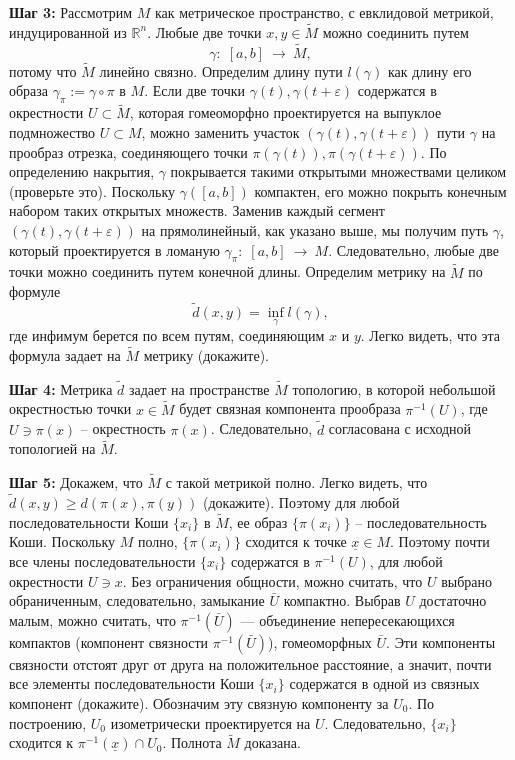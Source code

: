 \documentclass[12pt]{book}
\newcommand{\arrow}{{\:\longrightarrow\:}}
\renewcommand{\epsilon}{\varepsilon}
\def\R{{\mathbb R}}
\theoremstyle{upshape}
\theoremstyle{generic}
\theoremstyle{upshapenonumber}
\newcommand{\следствие}{%
     \refstepcounter{teorema}
     {\noindent\bf Следствие \thechapter.\arabic{teorema}:\ }}
\newcommand{\пример}{%
     \refstepcounter{teorema}
     {\noindent\bf Пример \thechapter.\arabic{teorema}:\ }}
\newcommand{\лемма}{%
     \refstepcounter{teorema}
     {\noindent\bf Лемма \thechapter.\arabic{teorema}:\ }}
\newcommand{\теорема}{%
     \refstepcounter{teorema}
     {\noindent\bf Теорема \thechapter.\arabic{teorema}:\ }}
\newcommand{\утверждение}{%
     \refstepcounter{teorema}
     {\noindent\bf Утверждение \thechapter.\arabic{teorema}:\ }}
\def\хфилл{\hfill}
\def\ноиндент{\noindent}
\def\бф{\bf}
\begin{document}
\ноиндент
{\бф Шаг 3:}
Рассмотрим $M$ как метрическое пространство,
с евклидовой метрикой, индуцированной из $\R^n$.
Любые две точки $x, y\in \tilde M$ можно соединить
путем \[ \gamma:\; [a,b] \arrow \tilde M,\] потому что $\tilde M$ линейно связно.
Определим длину пути $l(\gamma)$
как длину его образа $\gamma_\pi:= \gamma\circ \pi$ в $M$.
Если две точки $\gamma(t), \gamma(t+\epsilon)$
содержатся в окрестности $U\subset \tilde M$, которая
гомеоморфно проектируется на выпуклое подмножество
$U\subset M$, можно заменить участок $(\gamma(t), \gamma(t+\epsilon))$
пути $\gamma$ на прообраз отрезка, соединяющего точки
$\pi(\gamma(t)), \pi(\gamma(t+\epsilon))$.
По определению накрытия, $\gamma$ покрывается
такими открытыми множествами целиком
(проверьте это). Поскольку $\gamma([a,b])$
компактен, его можно покрыть конечным набором
таких открытых множеств. Заменив каждый
сегмент $(\gamma(t), \gamma(t+\epsilon))$
на прямолинейный, как указано выше, мы 
получим путь $\gamma$, который проектируется
в ломаную $\gamma_\pi:\; [a,b] \arrow M$.
Следовательно, любые две точки можно соединить
путем конечной длины. Определим метрику
на $\tilde M$ по формуле
\[
\tilde d(x,y) = \inf_\gamma l(\gamma),
\]
где инфимум берется по всем путям, соединяющим
$x$ и $y$. Легко видеть, что эта формула
задает на $\tilde M$ метрику (докажите).


\хфилл


\ноиндент
{\бф Шаг 4:} Метрика $\tilde d$ задает на пространстве
$\tilde M$ топологию, в которой небольшой окрестностью
точки $x\in \tilde M$ будет связная компонента
прообраза $\pi^{-1}(U)$, где $U\ni \pi(x)$ --
окрестность $\pi(x)$. Следовательно, $\tilde d$
согласована с исходной топологией на $\tilde M$.

\хфилл


\ноиндент
{\бф Шаг 5:}
Докажем, что $\tilde M$ с такой метрикой полно.
 Легко видеть, что 
$\tilde d(x, y) \geq d(\pi(x), \pi(y))$ (докажите).
Поэтому для любой последовательности Коши
$\{x_i\}$ в $\tilde M$, ее образ $\{\pi(x_i)\}$ --
последовательность Коши. Поскольку $M$ полно,
$\{\pi(x_i)\}$ сходится к точке $\underline x\in M$.
Поэтому почти все члены последовательности 
$\{x_i\}$ содержатся в $\pi^{-1}(U)$, для
любой окрестности $U \ni x$. Без ограничения
общности, можно считать, что $U$ выбрано
обраниченным, следовательно, 
замыкание $\bar U$ компактно.
Выбрав $U$ достаточно малым, можно считать,
что $\pi^{-1}(\bar U)$ --- объединение
непересекающихся компактов (компонент связности
 $\pi^{-1}(\bar U)$), гомеоморфных
$\bar U$. Эти компоненты связности
отстоят друг от друга на положительное
расстояние, а значит,
почти все элементы последовательности
Коши $\{x_i\}$
содержатся в одной из связных
компонент  (докажите). Обозначим эту
связную компоненту за $U_0$.
По построению, $U_0$ изометрически
проектируется на $U$.
Следовательно, $\{x_i\}$ сходится
к $\pi^{-1}(\underline x)\cap U_0$.
Полнота $\tilde M$ доказана.
\end{document}

